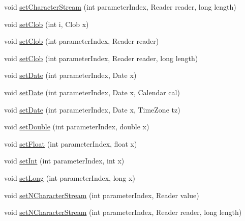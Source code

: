\begin{DoxyCompactItemize}
\item 
void \mbox{\hyperlink{interfacecom_1_1mysql_1_1cj_1_1_query_bindings_af4d619fe54e4d6b4354a9fa91ba1d198}{set\+Character\+Stream}} (int parameter\+Index, Reader reader, long length)
\item 
void \mbox{\hyperlink{interfacecom_1_1mysql_1_1cj_1_1_query_bindings_a4238c9057d5f6e2dff678d434a22531e}{set\+Clob}} (int i, Clob x)
\item 
void \mbox{\hyperlink{interfacecom_1_1mysql_1_1cj_1_1_query_bindings_a48fdd80cf86791a397b1bcbbd9292b2c}{set\+Clob}} (int parameter\+Index, Reader reader)
\item 
void \mbox{\hyperlink{interfacecom_1_1mysql_1_1cj_1_1_query_bindings_a45e48842db6bc099326134eaeb02012e}{set\+Clob}} (int parameter\+Index, Reader reader, long length)
\item 
void \mbox{\hyperlink{interfacecom_1_1mysql_1_1cj_1_1_query_bindings_a48a6f44ba31b49e2e6ebaabf412a4643}{set\+Date}} (int parameter\+Index, Date x)
\item 
void \mbox{\hyperlink{interfacecom_1_1mysql_1_1cj_1_1_query_bindings_a6047456befc84a09bb722b296b105513}{set\+Date}} (int parameter\+Index, Date x, Calendar cal)
\item 
void \mbox{\hyperlink{interfacecom_1_1mysql_1_1cj_1_1_query_bindings_a3eaaf6a0ab026896f99512a7e51800e2}{set\+Date}} (int parameter\+Index, Date x, Time\+Zone tz)
\item 
void \mbox{\hyperlink{interfacecom_1_1mysql_1_1cj_1_1_query_bindings_abb2dc0f5ac5f8285d522f5bd1c24083b}{set\+Double}} (int parameter\+Index, double x)
\item 
void \mbox{\hyperlink{interfacecom_1_1mysql_1_1cj_1_1_query_bindings_a47df49247d757f910257c813cb264d80}{set\+Float}} (int parameter\+Index, float x)
\item 
void \mbox{\hyperlink{interfacecom_1_1mysql_1_1cj_1_1_query_bindings_a36d4c03a617f88a81c421892c8f0f5f8}{set\+Int}} (int parameter\+Index, int x)
\item 
void \mbox{\hyperlink{interfacecom_1_1mysql_1_1cj_1_1_query_bindings_a727fb486e20d83e7d38c3ffbe682e3ef}{set\+Long}} (int parameter\+Index, long x)
\item 
void \mbox{\hyperlink{interfacecom_1_1mysql_1_1cj_1_1_query_bindings_ab2221a936de127f08e278adda1fb662b}{set\+N\+Character\+Stream}} (int parameter\+Index, Reader value)
\item 
void \mbox{\hyperlink{interfacecom_1_1mysql_1_1cj_1_1_query_bindings_a70f6f1d622ce392521652e5a16f56d84}{set\+N\+Character\+Stream}} (int parameter\+Index, Reader reader, long length)

\end{DoxyCompactItemize}
